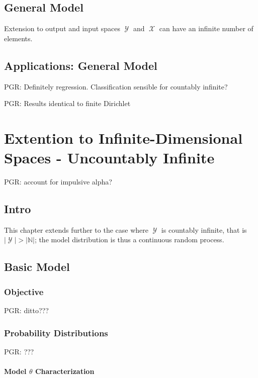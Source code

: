 \documentclass[12pt]{report}
\DeclareMathOperator{\Xcal}{\mathcal{X}}
\DeclareMathOperator{\Ycal}{\mathcal{Y}}
\begin{document}
\section{General Model}

Extension to output and input spaces $\Ycal$ and $\Xcal$ can have an infinite number of elements. 


\section{Applications: General Model}

PGR: Definitely regression. Classification sensible for countably infinite?

PGR: Results identical to finite Dirichlet












\chapter{Extention to Infinite-Dimensional Spaces - Uncountably Infinite}

PGR: account for impulsive alpha?


\section{Intro}

This chapter extends further to the case where $\Ycal$ is countably infinite, that is $|\Ycal| > |\mathbb{N}|$; the model distribution is thus a continuous random process. 


\section{Basic Model}


\subsection{Objective}

PGR: ditto???


\subsection{Probability Distributions}

PGR: ???


\subsubsection{Model $\theta$ Characterization}
\end{document}
